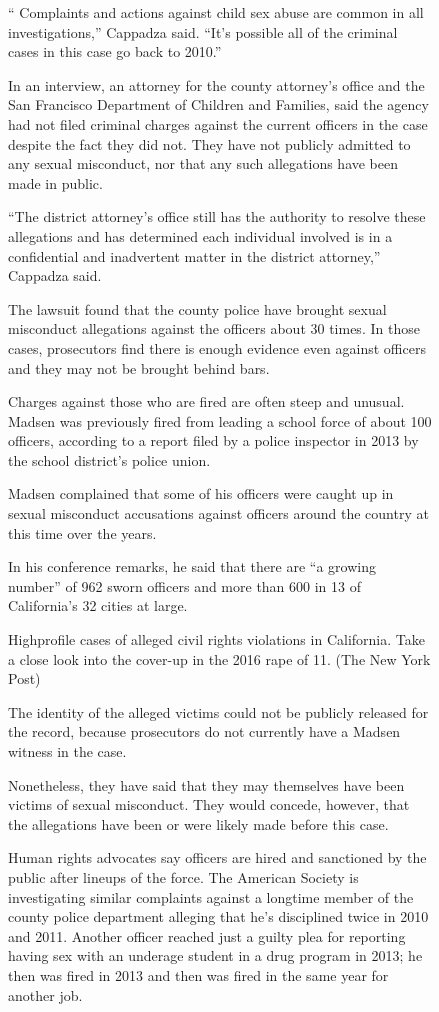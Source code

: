 \begin{figure}[p]
\begin{minipage}{\textwidth}
{“ Complaints and actions against child sex abuse are common in all investigations,” Cappadza said. “It’s possible all of the criminal cases in this case go back to 2010.”

In an interview, an attorney for the county attorney’s office and the San Francisco Department of Children and Families, said the agency had not filed criminal charges against the current officers in the case despite the fact they did not. They have not publicly admitted to any sexual misconduct, nor that any such allegations have been made in public.

“The district attorney’s office still has the authority to resolve these allegations and has determined each individual involved is in a confidential and inadvertent matter in the district attorney,” Cappadza said.

The lawsuit found that the county police have brought sexual misconduct allegations against the officers about 30 times. In those cases, prosecutors find there is enough evidence even against officers and they may not be brought behind bars.

Charges against those who are fired are often steep and unusual. Madsen was previously fired from leading a school force of about 100 officers, according to a report filed by a police inspector in 2013 by the school district’s police union.

Madsen complained that some of his officers were caught up in sexual misconduct accusations against officers around the country at this time over the years.

In his conference remarks, he said that there are “a growing number” of 962 sworn officers and more than 600 in 13 of California’s 32 cities at large.

Highprofile cases of alleged civil rights violations in California. Take a close look into the cover-up in the 2016 rape of 11. (The New York Post)

The identity of the alleged victims could not be publicly released for the record, because prosecutors do not currently have a Madsen witness in the case.

Nonetheless, they have said that they may themselves have been victims of sexual misconduct. They would concede, however, that the allegations have been or were likely made before this case.

Human rights advocates say officers are hired and sanctioned by the public after lineups of the force. The American Society is investigating similar complaints against a longtime member of the county police department alleging that he’s disciplined twice in 2010 and 2011. Another officer reached just a guilty plea for reporting having sex with an underage student in a drug program in 2013; he then was fired in 2013 and then was fired in the same year for another job.

}
\end{minipage}
\end{figure}
